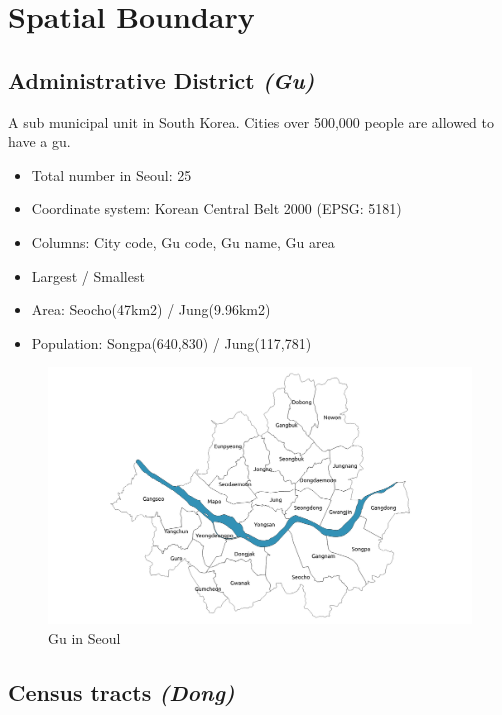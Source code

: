 \documentclass[]{book}
\providecommand{\tightlist}{%
  \setlength{\itemsep}{0pt}\setlength{\parskip}{0pt}}
\theoremstyle{definition}
\theoremstyle{definition}
\theoremstyle{definition}
\theoremstyle{remark}
\begin{document}
\chapter{Spatial Boundary}\label{spatial-boundary}

\section{\texorpdfstring{Administrative District
\emph{(Gu)}}{Administrative District (Gu)}}\label{administrative-district-gu}

A sub municipal unit in South Korea. Cities over 500,000 people are
allowed to have a gu.

\begin{itemize}
\tightlist
\item
  Total number in Seoul: 25
\item
  Coordinate system: Korean Central Belt 2000 (EPSG: 5181)
\item
  Columns: City code, Gu code, Gu name, Gu area
\item
  Largest / Smallest
\item
  Area: Seocho(47km2) / Jung(9.96km2)
\item
  Population: Songpa(640,830) / Jung(117,781)
\end{itemize}

\begin{figure}

{\centering \includegraphics[width=21.57in]{images/03_gu} 

}

\caption{\label{fig:figs}Gu in Seoul}\label{fig:unnamed-chunk-3}
\end{figure}

\section{\texorpdfstring{Census tracts
\emph{(Dong)}}{Census tracts (Dong)}}\label{census-tracts-dong}
\end{document}
